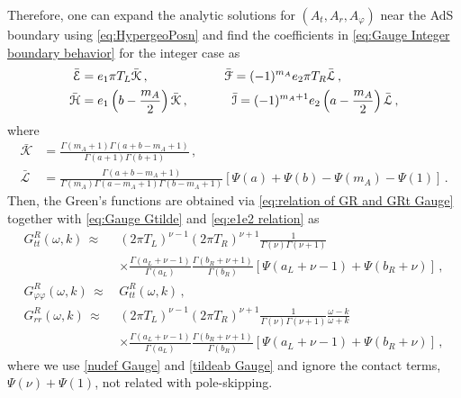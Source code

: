 \documentclass[11pt,a4paper]{article}
\begin{document}
Therefore, one can expand the analytic solutions for $(A_t, A_r, A_\varphi)$ near the AdS boundary using \eqref{eq:HypergeoPosn} and find the coefficients in \eqref{eq:Gauge Integer boundary behavior} for the integer case as
\begin{equation} \label{eq:Gauge Solution Behavior Int}
\begin{aligned}
    \bar{\mathcal{E}} & = e_1 \pi T_L \bar{\mathcal{K}}\,,
    & \bar{\mathcal{F}} = (-1)^{m_A} e_2 \pi T_R \bar{\mathcal{L}}\,, \hspace{1.6cm}\\
    \bar{\mathcal{H}} & = e_1 \left( b-\frac{m_A}{2} \right) \bar{\mathcal{K}}\,, \qquad
    & \bar{\mathcal{I}} = (-1)^{m_A+1} e_2 \left( a-\frac{m_A}{2} \right) \bar{\mathcal{L}}\,,
\end{aligned}
\end{equation}
where
\begin{equation}
\begin{aligned}
    \bar{\mathcal{K}} & = \frac{\Gamma(m_A+1)\Gamma(a+b-m_A+1)}{\Gamma(a+1) \Gamma(b+1)}\,, \\
    \bar{\mathcal{L}} & = \frac{\Gamma(a+b-m_A+1)}{\Gamma(m_A)\Gamma(a-m_A+1) \Gamma(b-m_A+1)}\left[ \Psi(a) + \Psi(b) - \Psi(m_A) -\Psi(1) \right] \,.
\end{aligned}
\end{equation}
Then, the Green's functions are obtained via \eqref{eq:relation of GR and GRt Gauge} together with \eqref{eq:Gauge Gtilde} and \eqref{eq:e1e2 relation} as
\begin{equation} \label{eq:Gauge GR Int Finite T}
\begin{aligned}
    G^R_{tt}(\omega, k) \, \approx \, & (2\pi T_L)^{\nu-1} (2\pi T_R)^{\nu+1} \frac{1}{\Gamma(\nu)\Gamma(\nu+1)} \\
    & \times \frac{\Gamma(a_L+\nu-1)}{\Gamma(a_L)} \frac{\Gamma(b_R+\nu+1)}{\Gamma(b_R)} \left[ \Psi(a_L+\nu-1) +\Psi(b_R+\nu) \right]\,,\\
    G^R_{\varphi \varphi}(\omega, k) \,\approx \, & G^R_{tt}(\omega, k)\,, \\
    G^R_{rr}(\omega, k) \,\approx \, & (2\pi T_L)^{\nu-1} (2\pi T_R)^{\nu+1} \frac{1}{\Gamma(\nu)\Gamma(\nu+1)}\frac{\omega-k}{\omega+k} \\
    & \times \frac{\Gamma(a_L+\nu-1)}{\Gamma(a_L)} \frac{\Gamma(b_R+\nu+1)}{\Gamma(b_R)} \left[ \Psi(a_L+\nu-1) +\Psi(b_R+\nu) \right]\,,
\end{aligned}
\end{equation}
where we use \eqref{nudef Gauge} and \eqref{tildeab Gauge} and ignore the contact terms, $\Psi(\nu)+\Psi(1)$, not related with pole-skipping.
\end{document}
